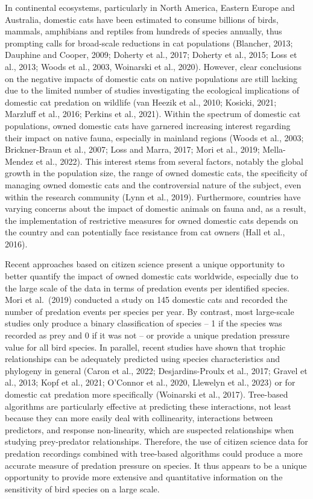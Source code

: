 \documentclass[
  super,
  review,
  3p]{elsarticle}
\begin{document}
In continental ecosystems, particularly in North America, Eastern Europe
and Australia, domestic cats have been estimated to consume billions of
birds, mammals, amphibians and reptiles from hundreds of species
annually, thus prompting calls for broad-scale reductions in cat
populations (Blancher, 2013; Dauphine and Cooper, 2009; Doherty et al.,
2017; Doherty et al., 2015; Loss et al., 2013; Woods et al., 2003,
Woinarski et al., 2020). However, clear conclusions on the negative
impacts of domestic cats on native populations are still lacking due to
the limited number of studies investigating the ecological implications
of domestic cat predation on wildlife (van Heezik et al., 2010; Kosicki,
2021; Marzluff et al., 2016; Perkins et al., 2021). Within the spectrum
of domestic cat populations, owned domestic cats have garnered
increasing interest regarding their impact on native fauna, especially
in mainland regions (Woods et al., 2003; Brickner-Braun et al., 2007;
Loss and Marra, 2017; Mori et al., 2019; Mella-Mendez et al., 2022).
This interest stems from several factors, notably the global growth in
the population size, the range of owned domestic cats, the specificity
of managing owned domestic cats and the controversial nature of the
subject, even within the research community (Lynn et al., 2019).
Furthermore, countries have varying concerns about the impact of
domestic animals on fauna and, as a result, the implementation of
restrictive measures for owned domestic cats depends on the country and
can potentially face resistance from cat owners (Hall et al., 2016).

Recent approaches based on citizen science present a unique opportunity
to better quantify the impact of owned domestic cats worldwide,
especially due to the large scale of the data in terms of predation
events per identified species. Mori et al.~(2019) conducted a study on
145 domestic cats and recorded the number of predation events per
species per year. By contrast, most large-scale studies only produce a
binary classification of species -- 1 if the species was recorded as
prey and 0 if it was not -- or provide a unique predation pressure value
for all bird species. In parallel, recent studies have shown that
trophic relationships can be adequately predicted using species
characteristics and phylogeny in general (Caron et al., 2022;
Desjardins-Proulx et al., 2017; Gravel et al., 2013; Kopf et al., 2021;
O'Connor et al., 2020, Llewelyn et al., 2023) or for domestic cat
predation more specifically (Woinarski et al., 2017). Tree-based
algorithms are particularly effective at predicting these interactions,
not least because they can more easily deal with collinearity,
interactions between predictors, and response non-linearity, which are
suspected relationships when studying prey-predator relationships.
Therefore, the use of citizen science data for predation recordings
combined with tree-based algorithms could produce a more accurate
measure of predation pressure on species. It thus appears to be a unique
opportunity to provide more extensive and quantitative information on
the sensitivity of bird species on a large scale.
\end{document}
